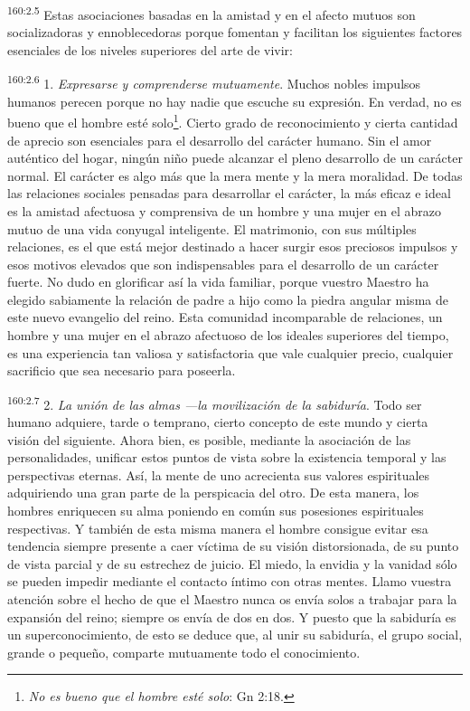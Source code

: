 \par
\textsuperscript{160:2.5} Estas asociaciones basadas en la amistad y en el afecto mutuos son socializadoras y ennoblecedoras porque fomentan y facilitan los siguientes factores esenciales de los niveles superiores del arte de vivir:

\par
\textsuperscript{160:2.6} 1. \textit{Expresarse y comprenderse mutuamente}. Muchos nobles impulsos humanos perecen porque no hay nadie que escuche su expresión. En verdad, no es bueno que el hombre esté solo\footnote{\textit{No es bueno que el hombre esté solo}: Gn 2:18.}. Cierto grado de reconocimiento y cierta cantidad de aprecio son esenciales para el desarrollo del carácter humano. Sin el amor auténtico del hogar, ningún niño puede alcanzar el pleno desarrollo de un carácter normal. El carácter es algo más que la mera mente y la mera moralidad. De todas las relaciones sociales pensadas para desarrollar el carácter, la más eficaz e ideal es la amistad afectuosa y comprensiva de un hombre y una mujer en el abrazo mutuo de una vida conyugal inteligente. El matrimonio, con sus múltiples relaciones, es el que está mejor destinado a hacer surgir esos preciosos impulsos y esos motivos elevados que son indispensables para el desarrollo de un carácter fuerte. No dudo en glorificar así la vida familiar, porque vuestro Maestro ha elegido sabiamente la relación de padre a hijo como la piedra angular misma de este nuevo evangelio del reino. Esta comunidad incomparable de relaciones, un hombre y una mujer en el abrazo afectuoso de los ideales superiores del tiempo, es una experiencia tan valiosa y satisfactoria que vale cualquier precio, cualquier sacrificio que sea necesario para poseerla.

\par
\textsuperscript{160:2.7} 2. \textit{La unión de las almas ---la movilización de la sabiduría}. Todo ser humano adquiere, tarde o temprano, cierto concepto de este mundo y cierta visión del siguiente. Ahora bien, es posible, mediante la asociación de las personalidades, unificar estos puntos de vista sobre la existencia temporal y las perspectivas eternas. Así, la mente de uno acrecienta sus valores espirituales adquiriendo una gran parte de la perspicacia del otro. De esta manera, los hombres enriquecen su alma poniendo en común sus posesiones espirituales respectivas. Y también de esta misma manera el hombre consigue evitar esa tendencia siempre presente a caer víctima de su visión distorsionada, de su punto de vista parcial y de su estrechez de juicio. El miedo, la envidia y la vanidad sólo se pueden impedir mediante el contacto íntimo con otras mentes. Llamo vuestra atención sobre el hecho de que el Maestro nunca os envía solos a trabajar para la expansión del reino; siempre os envía de dos en dos. Y puesto que la sabiduría es un superconocimiento, de esto se deduce que, al unir su sabiduría, el grupo social, grande o pequeño, comparte mutuamente todo el conocimiento.

